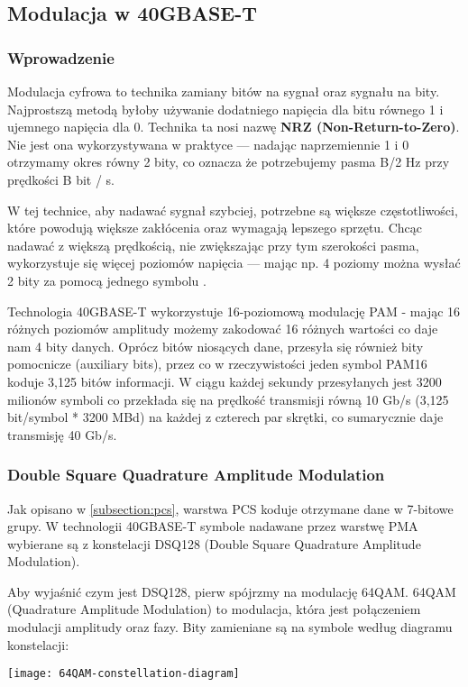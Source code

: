 \subsection{Modulacja w 40GBASE-T}
\subsubsection{Wprowadzenie}
Modulacja cyfrowa to technika zamiany bitów na sygnał oraz sygnału na bity. Najprostszą metodą byłoby używanie dodatniego napięcia dla bitu równego 1 i ujemnego napięcia dla 0. Technika ta nosi nazwę \textbf{NRZ (Non-Return-to-Zero)}. Nie jest ona wykorzystywana w praktyce --- nadając naprzemiennie 1 i 0 otrzymamy okres równy 2 bity, co oznacza że potrzebujemy pasma B/2 Hz przy prędkości B bit / s.

W tej technice, aby nadawać sygnał szybciej, potrzebne są większe częstotliwości, które powodują większe zakłócenia oraz wymagają lepszego sprzętu.
Chcąc nadawać z większą prędkością, nie zwiększając przy tym szerokości pasma, wykorzystuje się więcej poziomów napięcia --- mając np. 4 poziomy można wysłać 2 bity za pomocą jednego symbolu \cite{Computer-networks-Tanenbaum}.

Technologia 40GBASE-T wykorzystuje 16-poziomową modulację PAM - mając 16 różnych poziomów amplitudy możemy zakodować 16 różnych wartości co daje nam 4 bity danych.
Oprócz bitów niosących dane, przesyła się również bity pomocnicze (auxiliary bits), przez co w rzeczywistości jeden symbol PAM16 koduje 3,125 bitów informacji.
W ciągu każdej sekundy przesyłanych jest 3200 milionów symboli co przekłada się na prędkość transmisji równą 10 Gb/s (3,125 bit/symbol * 3200 MBd) na każdej z czterech par skrętki, co sumarycznie daje transmisję 40 Gb/s.

\subsubsection{Double Square Quadrature Amplitude Modulation}
Jak opisano w \ref{subsection:pcs}, warstwa PCS koduje otrzymane dane w 7-bitowe grupy. W technologii 40GBASE-T symbole nadawane przez warstwę PMA wybierane są z konstelacji DSQ128 (Double Square Quadrature Amplitude Modulation).

Aby wyjaśnić czym jest DSQ128, pierw spójrzmy na modulację 64QAM. 64QAM (Quadrature Amplitude Modulation) to modulacja, która jest połączeniem modulacji amplitudy oraz fazy. Bity zamieniane są na symbole według diagramu konstelacji:

\texttt{[image: 64QAM-constellation-diagram]}

